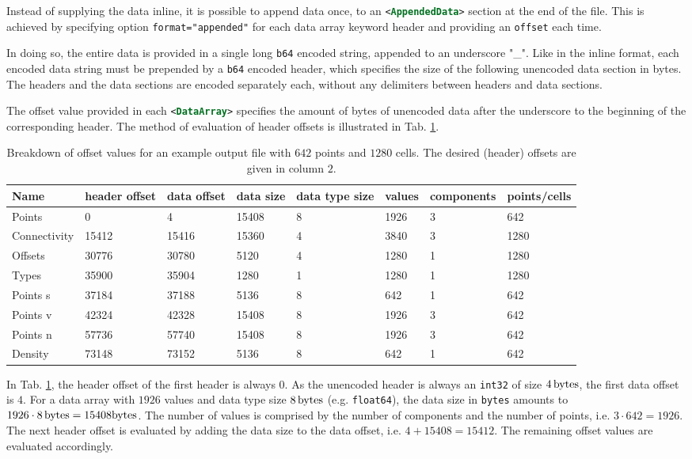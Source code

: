 \bigbreak
Instead of supplying the data inline, it is possible to append data once, to an \lstinline[language=XML]{<AppendedData>} section at the end of the file. This is achieved by specifying option \lstinline[language=XML]{format="appended"} for each data array keyword header and providing an \lstinline[language=XML]{offset} each time.

\bigbreak
In doing so, the entire data is provided in a single long \texttt{b64} encoded string, appended to an underscore "\_". Like in the inline format, each encoded data string must be prepended by a \texttt{b64} encoded header, which specifies the size of the following unencoded data section in bytes. The headers and the data sections are encoded separately each, without any delimiters between headers and data sections.

\bigbreak
The offset value provided in each \lstinline[language=XML]{<DataArray>} specifies the amount of bytes of unencoded data after the underscore to the beginning of the corresponding header. The method of evaluation of header offsets is illustrated in Tab. \ref{tab:offset}.

\begin{table}[t]
  \caption{Breakdown of offset values for an example output file with $642$ points and $1280$ cells. The desired (header) offsets are given in column $2$.}
  \begin{tabular}{@{}llllllll@{}}
    Name & header offset & data offset & data size & data type size & values & components & points/cells \\\midrule
    Points & 0 & 4 & 15408 & 8 & 1926 & 3 & 642\\
    Connectivity & 15412 & 15416 & 15360 & 4 & 3840 & 3 & 1280\\
    Offsets & 30776 & 30780 & 5120 & 4 & 1280 & 1 & 1280\\
    Types & 35900 & 35904 & 1280 & 1 & 1280 & 1 & 1280\\
    Points s & 37184 & 37188 & 5136 & 8 & 642 & 1 & 642\\
    Points v & 42324 & 42328 & 15408 & 8 & 1926 & 3 & 642\\
    Points n & 57736 & 57740 & 15408 & 8 & 1926 & 3 & 642\\
    Density & 73148 & 73152 & 5136 & 8 & 642 & 1 & 642\\\bottomrule
  \end{tabular}
  \label{tab:offset}
\end{table}

\bigbreak
In Tab. \ref{tab:offset}, the header offset of the first header is always $0$. As the unencoded header is always an \lstinline[language=C]{int32} of size $4\,{\rm bytes}$, the first data offset is $4$. For a data array with $1926$ values and data type size $8\,{\rm bytes}$ (e.g. \lstinline[language=C]{float64}), the data size in \lstinline[language=C]{bytes} amounts to $1926\cdot8\,{\rm bytes}=15408{\rm bytes}$. The number of values is comprised by the number of components and the number of points, i.e. $3\cdot642=1926$. The next header offset is evaluated by adding the data size to the data offset, i.e. $4+15408=15412$. The remaining offset values are evaluated accordingly.

